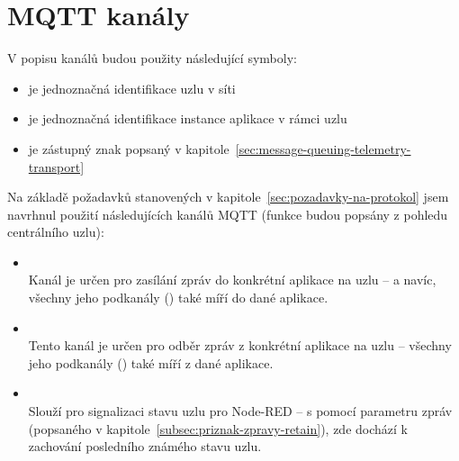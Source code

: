 \section{MQTT kanály}\label{sec:mqtt-kanaly}
V popisu kanálů budou použity následující symboly:
\begin{itemize}
    \item {} je jednoznačná identifikace uzlu v síti 
    \item {} je jednoznačná identifikace instance aplikace v rámci uzlu
    \item \ic{\#} je zástupný znak popsaný v kapitole~\ref{sec:message-queuing-telemetry-transport}
\end{itemize}

Na základě požadavků stanovených v kapitole~\ref{sec:pozadavky-na-protokol} jsem navrhnul použití následujících kanálů
MQTT (funkce budou popsány z pohledu centrálního uzlu):

\begin{itemize}
    \item {} \\
    Kanál je určen pro zasílání zpráv do konkrétní aplikace na uzlu -- a navíc,
    všechny jeho podkanály () také míří do dané aplikace.

    \item {} \\
    Tento kanál je určen pro odběr zpráv z konkrétní aplikace na uzlu --
    všechny jeho podkanály () také míří z dané aplikace.

    \item {} \\
    Slouží pro signalizaci stavu uzlu pro Node-RED -- s pomocí parametru zpráv  (popsaného v
    kapitole~\ref{subsec:priznak-zpravy-retain}), zde dochází k zachování posledního známého stavu uzlu.
\end{itemize}



